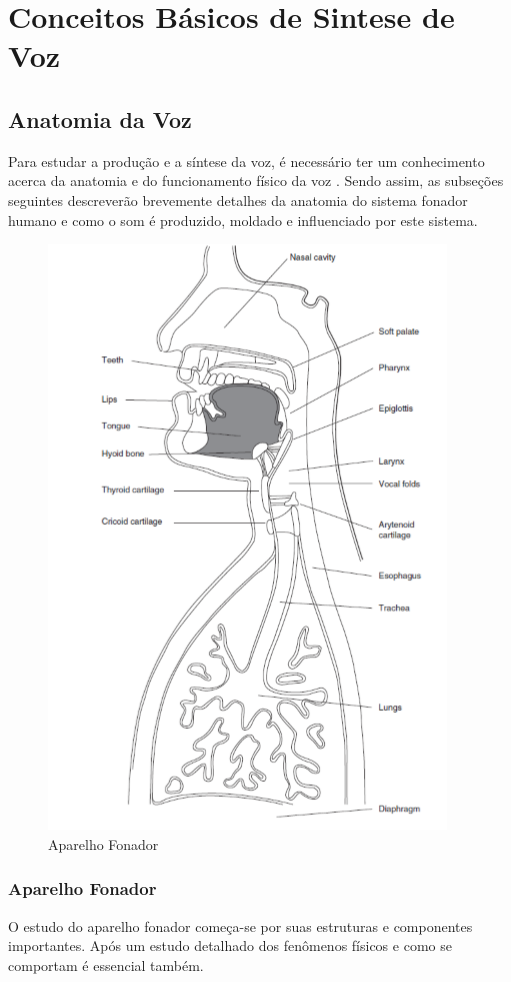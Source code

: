 
\chapter{Conceitos Básicos de Sintese de Voz}
\section{Anatomia da Voz}
	Para estudar a produção e a síntese da voz, é necessário ter um conhecimento acerca da anatomia e do funcionamento físico da voz . Sendo assim, as subseções seguintes descreverão brevemente detalhes da anatomia do sistema fonador humano e como o som é produzido, moldado e inﬂuenciado por este sistema.
	
	\begin{figure}
		\centering
		\includegraphics[scale=0.5]{aparelhoFonador}
		\caption{Aparelho Fonador}
		\label{fig:aparelhoFonador}
	\end{figure}
	\subsection{Aparelho Fonador}
	O estudo do aparelho fonador começa-se por suas estruturas e componentes importantes. Após um estudo detalhado dos fenômenos físicos e como se comportam é essencial também.
		
